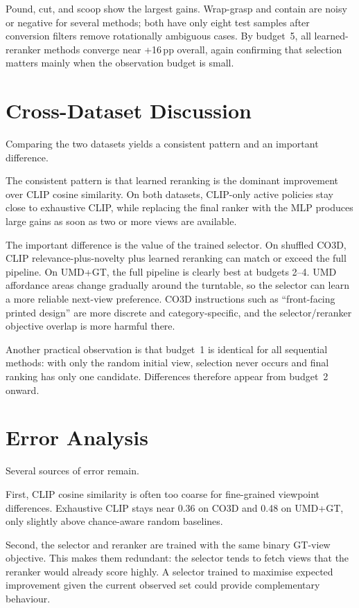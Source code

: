 Pound, cut, and scoop show the largest gains. Wrap-grasp and contain are noisy or negative for several methods; both have only eight test samples after conversion filters remove rotationally ambiguous cases. By budget~5, all learned-reranker methods converge near +16\,pp overall, again confirming that selection matters mainly when the observation budget is small.

\section{Cross-Dataset Discussion}

Comparing the two datasets yields a consistent pattern and an important difference.

The consistent pattern is that learned reranking is the dominant improvement over CLIP cosine similarity. On both datasets, CLIP-only active policies stay close to exhaustive CLIP, while replacing the final ranker with the MLP produces large gains as soon as two or more views are available.

The important difference is the value of the trained selector. On shuffled CO3D, CLIP relevance-plus-novelty plus learned reranking can match or exceed the full pipeline. On UMD+GT, the full pipeline is clearly best at budgets 2--4. UMD affordance areas change gradually around the turntable, so the selector can learn a more reliable next-view preference. CO3D instructions such as ``front-facing printed design'' are more discrete and category-specific, and the selector/reranker objective overlap is more harmful there.

Another practical observation is that budget~1 is identical for all sequential methods: with only the random initial view, selection never occurs and final ranking has only one candidate. Differences therefore appear from budget~2 onward.

\section{Error Analysis}

Several sources of error remain.

First, CLIP cosine similarity is often too coarse for fine-grained viewpoint differences. Exhaustive CLIP stays near 0.36 on CO3D and 0.48 on UMD+GT, only slightly above chance-aware random baselines.

Second, the selector and reranker are trained with the same binary GT-view objective. This makes them redundant: the selector tends to fetch views that the reranker would already score highly. A selector trained to maximise expected improvement given the current observed set could provide complementary behaviour.

